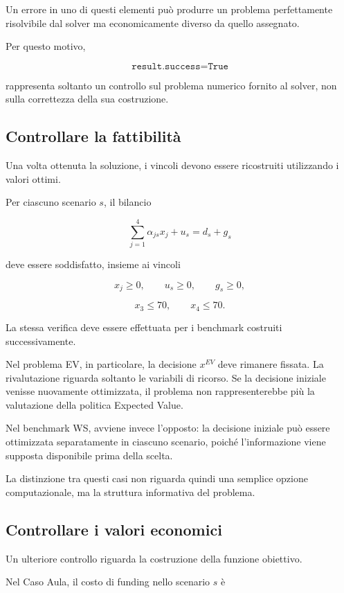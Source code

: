 Un errore in uno di questi elementi pu\`o produrre un problema perfettamente
risolvibile dal solver ma economicamente diverso da quello assegnato.

Per questo motivo,

\[
\texttt{result.success=True}
\]

\noindent rappresenta soltanto un controllo sul problema numerico fornito al
solver, non sulla correttezza della sua costruzione.

\subsection{Controllare la fattibilit\`a}

Una volta ottenuta la soluzione, i vincoli devono essere ricostruiti
utilizzando i valori ottimi.

Per ciascuno scenario \(s\), il bilancio

\[
\sum_{j=1}^{4}\alpha_{js}x_j
+
u_s
=
d_s+g_s
\]

\noindent deve essere soddisfatto, insieme ai vincoli

\[
x_j\geq 0,
\qquad
u_s\geq 0,
\qquad
g_s\geq 0,
\]

\[
x_3\leq 70,
\qquad
x_4\leq 70.
\]

La stessa verifica deve essere effettuata per i benchmark costruiti
successivamente.

Nel problema EV, in particolare, la decisione \(x^{EV}\) deve rimanere
fissata. La rivalutazione riguarda soltanto le variabili di ricorso. Se la
decisione iniziale venisse nuovamente ottimizzata, il problema non
rappresenterebbe pi\`u la valutazione della politica Expected Value.

Nel benchmark WS, avviene invece l'opposto: la decisione iniziale pu\`o essere
ottimizzata separatamente in ciascuno scenario, poich\'e l'informazione viene
supposta disponibile prima della scelta.

La distinzione tra questi casi non riguarda quindi una semplice opzione
computazionale, ma la struttura informativa del problema.

\subsection{Controllare i valori economici}

Un ulteriore controllo riguarda la costruzione della funzione obiettivo.

Nel Caso Aula, il costo di funding nello scenario \(s\) \`e

